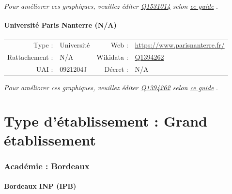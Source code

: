 \documentclass[11pt,french,landscape]{article}
\begin{document}
\textit{\scriptsize Pour améliorer ces graphiques, veuillez éditer \href{https://www.wikidata.org/entity/Q1531014}{Q1531014}  selon \href{https://github.com/cpesr/wikidataESR/blob/master/Rmd/wikidataESR.md}{ce guide}}
.


\newpage

\hypertarget{universituxe9-paris-nanterre-na}{%
\subsection{Université Paris Nanterre
(N/A)}\label{universituxe9-paris-nanterre-na}}

\begin{tabular*}{0.45\textwidth}{rp{2cm}rl}  
\hline  
Type : & Université & Web : &\href{https://www.parisnanterre.fr/}{https://www.parisnanterre.fr/} \\  
Rattachement : & N/A & Wikidata : & \href{https://www.wikidata.org/entity/Q1394262}{Q1394262} \\  
UAI : & 0921204J & Décret : & N/A \\  
\hline  
\end{tabular*}

\textit{\scriptsize Pour améliorer ces graphiques, veuillez éditer \href{https://www.wikidata.org/entity/Q1394262}{Q1394262}  selon \href{https://github.com/cpesr/wikidataESR/blob/master/Rmd/wikidataESR.md}{ce guide}}
.


\newpage   
\vspace*{5cm}   
\part{Type d'établissement :  Grand établissement }   
\newpage

\hypertarget{acaduxe9mie-bordeaux-1}{%
\section{Académie : Bordeaux}\label{acaduxe9mie-bordeaux-1}}

\hypertarget{bordeaux-inp-ipb}{%
\subsection{Bordeaux INP (IPB)}\label{bordeaux-inp-ipb}}
\end{document}

